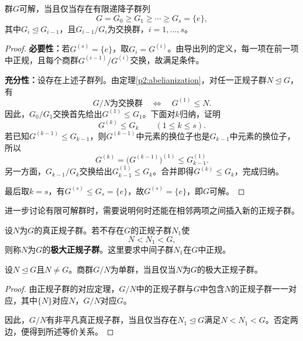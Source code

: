\begin{theorem}\label{p2:solvable-series}
群$G$可解，当且仅当存在有限递降子群列
\[
G=G_0\geq G_1\geq\cdots\geq G_s=\{e\},
\]
其中$G_i\trianglelefteq G_{i-1}$，且$G_{i-1}/G_i$为交换群，$i=1,\ldots,s$。
\end{theorem}
\begin{proof}
\textbf{必要性：}若$G^{(s)}=\{e\}$，取$G_i=G^{(i)}$。由导出列的定义，每一项在前一项中正规，且每个商群$G^{(i-1)}/G^{(i)}$交换，故满足条件。

\textbf{充分性：}设存在上述子群列。由定理\ref{p2:abelianization}，对任一正规子群$N\trianglelefteq G$，有
\[
G/N\text{为交换群}\quad\Longleftrightarrow\quad G^{(1)}\leq N.
\]
因此，$G_0/G_1$交换首先给出$G^{(1)}\leq G_1$。下面对$k$归纳，证明
\[
G^{(k)}\leq G_k\qquad(1\leq k\leq s).
\]
若已知$G^{(k-1)}\leq G_{k-1}$，则$G^{(k-1)}$中元素的换位子也是$G_{k-1}$中元素的换位子，所以
\[
G^{(k)}=\bigl(G^{(k-1)}\bigr)^{(1)}\leq G_{k-1}^{(1)}.
\]
另一方面，$G_{k-1}/G_k$交换给出$G_{k-1}^{(1)}\leq G_k$。合并即得$G^{(k)}\leq G_k$，完成归纳。

最后取$k=s$，有$G^{(s)}\leq G_s=\{e\}$，故$G^{(s)}=\{e\}$，即$G$可解。
\end{proof}

进一步讨论有限可解群时，需要说明何时还能在相邻两项之间插入新的正规子群。

\begin{definition}
设$N$为$G$的真正规子群。若不存在$G$的正规子群$N_1$使
\[
N<N_1<G,
\]
则称$N$为$G$的\textbf{极大正规子群}。这里要求中间子群$N_1$在$G$中正规。
\end{definition}

\begin{proposition}
设$N\trianglelefteq G$且$N\ne G$。商群$G/N$为单群，当且仅当$N$为$G$的极大正规子群。
\end{proposition}
\begin{proof}
由正规子群的对应定理，$G/N$中的正规子群与$G$中包含$N$的正规子群一一对应，其中$\{N\}$对应$N$，$G/N$对应$G$。

因此，$G/N$有非平凡真正规子群，当且仅当存在$N_1\trianglelefteq G$满足$N<N_1<G$。否定两边，便得到所述等价关系。
\end{proof}

